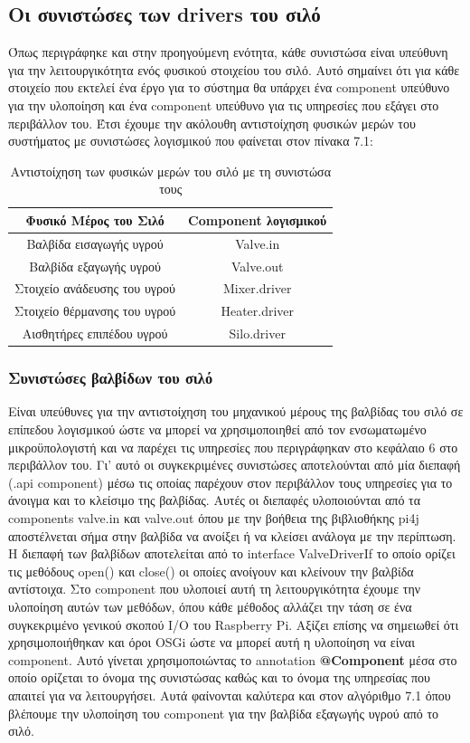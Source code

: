 \subsection{Οι συνιστώσες των drivers του σιλό}
Όπως περιγράφηκε και στην προηγούμενη ενότητα, κάθε συνιστώσα είναι υπεύθυνη για την λειτουργικότητα ενός φυσικού στοιχείου του σιλό. Αυτό σημαίνει ότι για κάθε στοιχείο που εκτελεί ένα έργο για το σύστημα θα υπάρχει ένα component υπεύθυνο για την υλοποίηση και ένα component υπεύθυνο για τις υπηρεσίες που εξάγει στο περιβάλλον του. Έτσι έχουμε την ακόλουθη αντιστοίχηση φυσικών μερών του συστήματος με συνιστώσες λογισμικού που φαίνεται στον πίνακα 7.1:


\begin{table}[h]
\centering
\begin{tabular}{|c|c|}
\hline
\textbf{Φυσικό Μέρος του Σιλό} & \textbf{Component λογισμικού} \\ \hline
Βαλβίδα εισαγωγής υγρού & Valve.in \\ \hline
Βαλβίδα εξαγωγής υγρού & Valve.out \\ \hline
Στοιχείο ανάδευσης του υγρού & Mixer.driver \\ \hline
Στοιχείο θέρμανσης του υγρού & Heater.driver \\ \hline
Αισθητήρες επιπέδου υγρού & Silo.driver \\ \hline
\end{tabular}
\caption{Αντιστοίχηση των φυσικών μερών του σιλό με τη συνιστώσα τους}
\label{my-label}
\end{table}

\subsubsection{Συνιστώσες βαλβίδων του σιλό}
	Είναι υπεύθυνες για την αντιστοίχηση του μηχανικού μέρους της βαλβίδας του σιλό σε επίπεδου λογισμικού ώστε να μπορεί να χρησιμοποιηθεί από τον ενσωματωμένο μικροϋπολογιστή και να παρέχει τις υπηρεσίες που περιγράφηκαν στο κεφάλαιο 6 στο περιβάλλον του. Γι’ αυτό οι συγκεκριμένες συνιστώσες αποτελούνται από μία διεπαφή (.api component) μέσω τις οποίας παρέχουν στον περιβάλλον τους υπηρεσίες για το άνοιγμα και το κλείσιμο της βαλβίδας. Αυτές οι διεπαφές υλοποιούνται από τα components valve.in και valve.out όπου με την βοήθεια της βιβλιοθήκης pi4j αποστέλνεται σήμα στην βαλβίδα να ανοίξει ή να κλείσει ανάλογα με την περίπτωση.  Η διεπαφή των βαλβίδων αποτελείται από το interface ValveDriverIf το οποίο ορίζει τις μεθόδους open() και close() οι οποίες ανοίγουν και κλείνουν την βαλβίδα αντίστοιχα. Στο component που υλοποιεί αυτή τη λειτουργικότητα έχουμε την υλοποίηση αυτών των μεθόδων, όπου κάθε μέθοδος αλλάζει την τάση σε ένα συγκεκριμένο γενικού σκοπού I/O του Raspberry Pi. Αξίζει επίσης να σημειωθεί ότι χρησιμοποιήθηκαν και όροι OSGi ώστε να μπορεί αυτή η υλοποίηση να είναι component. Αυτό γίνεται χρησιμοποιώντας το annotation \textbf{@Component} μέσα στο οποίο ορίζεται το όνομα της συνιστώσας καθώς και το όνομα της υπηρεσίας που απαιτεί για να λειτουργήσει. Αυτά φαίνονται καλύτερα και στον αλγόριθμο 7.1 όπου βλέπουμε την υλοποίηση του component για την βαλβίδα εξαγωγής υγρού από το σιλό. 


